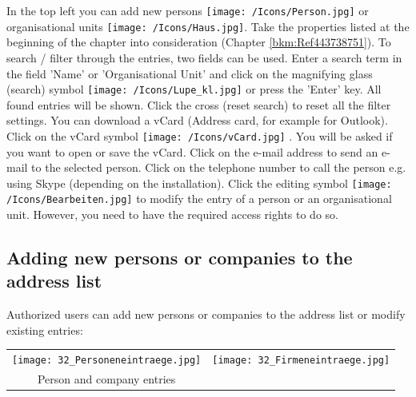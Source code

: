 In the top left you can add new persons \texttt{[image: /Icons/Person.jpg]} or organisational units \texttt{[image: /Icons/Haus.jpg]}. Take the properties listed at the beginning of the chapter into consideration (Chapter \ref{bkm:Ref443738751}). \newline
To search / filter through the entries, two fields can be used. Enter a search term in the field 'Name' or 'Organisational Unit'  and click on the magnifying glass (search) symbol \texttt{[image: /Icons/Lupe\_kl.jpg]}  or press the 'Enter' key. All found entries will be shown. Click the cross (reset search)  to reset all the filter settings. \newline
You can download a vCard (Address card, for example for Outlook). Click on the vCard symbol \texttt{[image: /Icons/vCard.jpg]} . You will be asked if you want to open or save the vCard.\newline
Click on the e-mail address  to send an e-mail to the selected person. Click on the telephone number  to call the person e.g. using Skype (depending on the installation).\newline
Click the editing symbol \texttt{[image: /Icons/Bearbeiten.jpg]}  to modify the entry of a person or an organisational unit. However, you need to have the required access rights to do so.

\subsection{Adding new persons or companies to the address list}
Authorized users can add new persons or companies to the address list or modify existing entries:

\vspace{\baselineskip}

\begin{tabular}{cc} %
\texttt{[image: 32\_Personeneintraege.jpg]} & \texttt{[image: 32\_Firmeneintraege.jpg]} \\
Person and company entries \\
\end{tabular}


